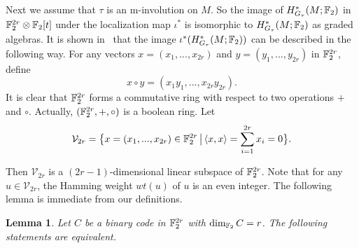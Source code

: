 \documentclass[12pt]{amsart}
\theoremstyle{plain} \numberwithin{equation}{section}
\newtheorem{lem}[thm]{Lemma}
\theoremstyle{definition}
\theoremstyle{remark}
\begin{document}

 Next we assume that $\tau$ is an $\mathrm{m}$-involution on $M$.
 So  
 the image of $H^*_{G_{\tau}}(M; {\Bbb F}_2)$ in ${\Bbb F}^{2r}_2 \otimes {\Bbb F}_2[t]$ under the
 localization map $\iota^*$ is isomorphic to $H^*_{G_{\tau}}(M; {\Bbb F}_2)$ as graded algebras.
 It is shown in~\cite{cl,p} that the image $\iota^*(H^*_{G_{\tau}}(M; {\Bbb F}_2))$ 
 can be described
 in the following way. For any vectors $x=(x_1,...,x_{2r})$ and $y=(y_1,...,y_{2r})$ in
${\Bbb F}_2^{2r}$, define
   $$x\circ y=(x_1y_1,...,x_{2r}y_{2r}).$$
It is clear that ${\Bbb F}_2^{2r}$ forms a commutative ring with respect to
two operations $+$ and $\circ$. Actually, $({\Bbb F}_2^{2r}, +, \circ)$ is a boolean ring.   Let
\begin{equation} \label{Equ:Big-V}
   \mathcal{V}_{2r}=\big\{x=(x_1,...,x_{2r})\in 
{\Bbb F}_2^{2r} \,\big| \, \langle x, x\rangle=\sum\limits_{i=1}^{2r}x_i=0\big\}.
\end{equation}
 
  Then  $\mathcal{V}_{2r}$ is a $(2r-1)$-dimensional linear 
  subspace of ${\Bbb F}_2^{2r}$. Note that for any $u\in \mathcal{V}_{2r}$, the Hamming weight
  $wt(u)$ of $u$ is an even integer. The following lemma is immediate from our definitions.

\begin{lem} \label{code} 
 Let $C$ be a binary code in ${\Bbb F}_2^{2r}$ with $\dim_{{\Bbb F}_2} C =r$.
 The following statements are equivalent.
\end{lem}
\end{document}
